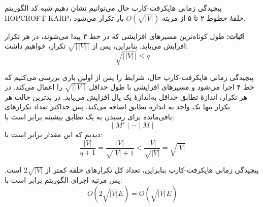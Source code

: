 \begin{itemframe}{‌پیچیدگی زمانی هاپکرفت-کارپ}
\itm
حال می‌توانیم نشان دهیم شبه کد الگوریتم HOPCROFT-KARP، حلقهٔ خطوط ۲ تا ۵ از مربته $O(\sqrt{|V|})$ بار تکرار می‌شود.

\itm
\textbf{اثبات:}
طول کوتاه‌ترین مسیرهای افزایشی که در خط ۳ پیدا می‌شوند، در هر تکرار افزایش می‌یابد. بنابراین، پس از
$\sqrt{\lceil |V| \rceil}$
تکرار، خواهیم داشت:
$$\sqrt{\lceil |V| \rceil} \leq q$$
\end{itemframe}


\begin{itemframe}{‌پیچیدگی زمانی هاپکرفت-کارپ}
\itm
حال، شرایط را پس از اولین باری بررسی می‌کنیم که خط ۴ اجرا می‌شود و مسیرهای افزایشی با طول حداقل
$\sqrt{\lceil |V| \rceil}$
 را اعمال می‌کند.
\itm
در هر تکرار، اندازهٔ تطابق حداقل به‌اندازهٔ یک یال افزایش می‌یابد. در بدترین حالت هر تکرار تنها یک واحد به اندازه تطابق اضافه می‌کند. پس حداکثر تعداد تکرارهای باقی‌مانده برای رسیدن به یک تطابق بیشینه برابر است با:
$$
∣M^∗∣−∣M∣
$$
\itm
دیدیم که این مقدار برابر است با:
$$
\frac{ |V|}{q + 1} = \frac{|V|}{\sqrt{|V|} + 1} < \frac{|V|}{\sqrt{|V|}} = \sqrt{|V|}
$$

\end{itemframe}


\begin{itemframe}{‌پیچیدگی زمانی هاپکرفت-کارپ}
\itm
بنابراین، تعداد کل تکرارهای حلقه کمتر از $2\sqrt{|V|}$ است. پس مرتبه اجرای الگوریتم برابر است با:
$$
O(2\sqrt{|V|} E) = O(\sqrt{|V|} E)
$$
\end{itemframe}
